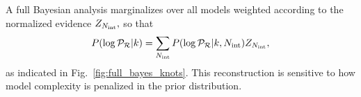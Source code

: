 A full Bayesian analysis marginalizes over all models weighted according to the normalized evidence $Z_{N_\mathrm{int}},$
so that
\begin{equation}
  P(\log\mathcal{P}_\mathcal{R}|k) = \sum\limits_{N_\mathrm{int}} P(\log\mathcal{P}_\mathcal{R}|k,N_\mathrm{int}) Z_{N_\mathrm{int}},
  \label{eqn:margPR_full}
\end{equation}
as indicated in Fig.~\ref{fig:full_bayes_knots}.
This reconstruction is sensitive to how model complexity is penalized in the prior distribution. 

